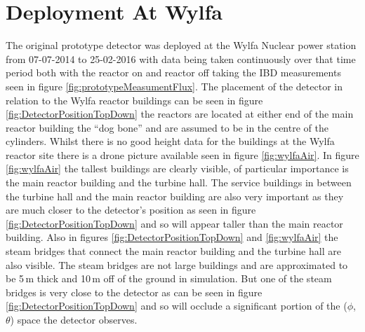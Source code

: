 
\section{Deployment At Wylfa}\label{sec:deploymentAtWylfa}
The original prototype detector was deployed at the Wylfa Nuclear power station from 07-07-2014 to 25-02-2016 with data being taken continuously over that time period both with the reactor on and reactor off taking the IBD measurements seen in figure \ref{fig:prototypeMeasumentFlux}. The placement of the detector in relation to the Wylfa reactor buildings can be seen in figure \ref{fig:DetectorPositionTopDown} the reactors are located at either end of the main reactor building the ``dog bone'' and are assumed to be in the centre of the cylinders. Whilst there is no good height data for the buildings at the Wylfa reactor site there is a drone picture available seen in figure \ref{fig:wylfaAir}. In figure \ref{fig:wylfaAir} the tallest buildings are clearly visible, of particular importance is the main reactor building and the turbine hall. The service buildings in between the turbine hall and the  main reactor building are also very important as they are much closer to the detector's position as seen in figure \ref{fig:DetectorPositionTopDown} and so will appear taller than the main reactor building. Also in figures \ref{fig:DetectorPositionTopDown} and \ref{fig:wylfaAir} the steam bridges that connect the main reactor building and the turbine hall are also visible. The steam bridges are not large buildings and are approximated to be 5\,m thick and 10\,m off of the ground in simulation. But one of the steam bridges is very close to the detector as can be seen in figure \ref{fig:DetectorPositionTopDown} and so will occlude a significant portion of the ($\phi$, $\theta$) space the detector observes. 

